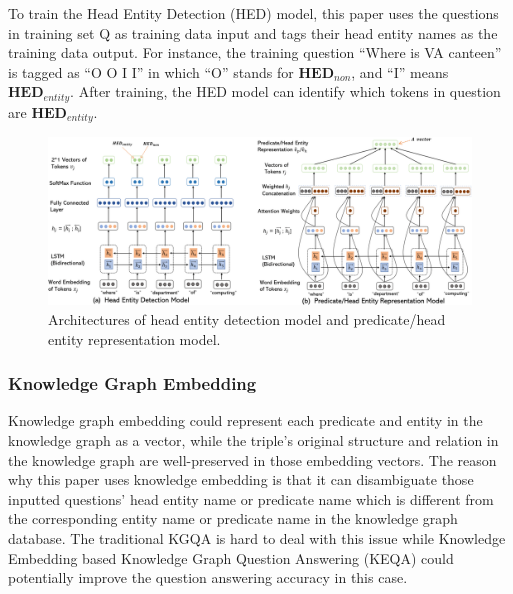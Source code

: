 \documentclass[11pt]{article}
\begin{document}
To train the Head Entity Detection (HED) model, this paper uses the questions in training set Q as training data input and tags their head entity names as the training data output. For instance, the training question ``Where is VA canteen'' is tagged as ``O O I I'' in which ``O'' stands for ${\mathbf{HED}}_{non}$, and ``I'' means ${\mathbf{HED}}_{entity}$. After training, the HED model can identify which tokens in question are ${\mathbf{HED}}_{entity}$.


\begin{figure}[htp]
    \centering
    \includegraphics[width=15cm]{submissions/kbqa-colledge/figs/figure3.pdf}
    \caption{Architectures of head entity detection model and predicate/head entity representation model.}
\end{figure}


\subsubsection{Knowledge Graph Embedding}\label{sec:Knowledge Graph Embedding}
Knowledge graph embedding \cite{c9, c11} could represent each predicate and entity in the knowledge graph as a vector, while the triple's original structure and relation in the knowledge graph are well-preserved in those embedding vectors. The reason why this paper uses knowledge embedding is that it can disambiguate those inputted questions' head entity name or predicate name which is different from the corresponding entity name or predicate name in the knowledge graph database. The traditional KGQA is hard to deal with this issue while Knowledge Embedding based Knowledge Graph Question Answering (KEQA) could potentially improve the question answering accuracy in this case.
\end{document}

